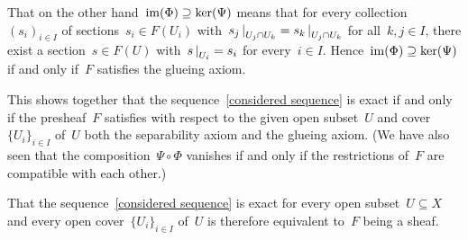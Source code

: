 That on the other hand~$\operatorname{im}(\Phi) \supseteq \ker(\Psi)$ means that for every collection~$(s_i)_{i \in I}$ of sections~$s_i \in F(U_i)$ with~$\restrict{s_j}{U_j \cap U_k} = \restrict{s_k}{U_j \cap U_k}$ for all~$k,j \in I$, there exist a section~$s \in F(U)$ with~$\restrict{s}{U_i} = s_i$ for every~$i \in I$.
Hence~$\operatorname{im}(\Phi) \supseteq \ker(\Psi)$ if and only if~$F$ satisfies the glueing axiom.

This shows together that the sequence~\eqref{considered sequence} is exact if and only if the presheaf~$F$ satisfies with respect to the given open subset~$U$ and cover~$\{ U_i \}_{i \in I}$ of~$U$ both the separability axiom and the glueing axiom.
(We have also seen that the composition~$\Psi \circ \Phi$ vanishes if and only if the restrictions of~$F$ are compatible with each other.)

That the sequence~\eqref{considered sequence} is exact for every open subset~$U \subseteq X$ and every open cover~$\{ U_i \}_{i \in I}$ of~$U$ is therefore equivalent to~$F$ being a sheaf.




